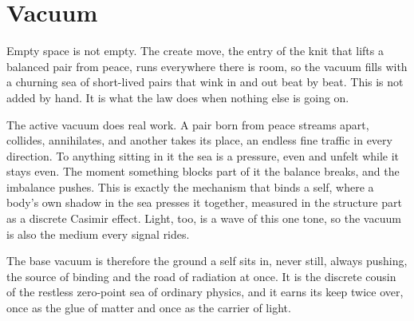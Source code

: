 \section{Vacuum}

Empty space is not empty. The create move, the entry of the knit that lifts a balanced pair from peace, runs everywhere there is room, so the vacuum fills with a churning sea of short-lived pairs that wink in and out beat by beat. This is not added by hand. It is what the law does when nothing else is going on.

The active vacuum does real work. A pair born from peace streams apart, collides, annihilates, and another takes its place, an endless fine traffic in every direction. To anything sitting in it the sea is a pressure, even and unfelt while it stays even. The moment something blocks part of it the balance breaks, and the imbalance pushes. This is exactly the mechanism that binds a self, where a body's own shadow in the sea presses it together, measured in the structure part as a discrete Casimir effect. Light, too, is a wave of this one tone, so the vacuum is also the medium every signal rides.

The base vacuum is therefore the ground a self sits in, never still, always pushing, the source of binding and the road of radiation at once. It is the discrete cousin of the restless zero-point sea of ordinary physics, and it earns its keep twice over, once as the glue of matter and once as the carrier of light.
